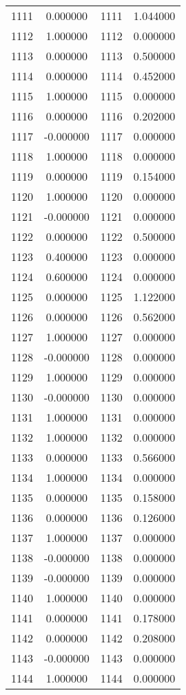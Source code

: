 \documentclass[12pt]{article}
\begin{document}
\begin{longtable}{@{}cccc@{}}
1111 & 0.000000 & 1111 & 1.044000 \\
1112 & 1.000000 & 1112 & 0.000000 \\
1113 & 0.000000 & 1113 & 0.500000 \\
1114 & 0.000000 & 1114 & 0.452000 \\
1115 & 1.000000 & 1115 & 0.000000 \\
1116 & 0.000000 & 1116 & 0.202000 \\
1117 & -0.000000 & 1117 & 0.000000 \\
1118 & 1.000000 & 1118 & 0.000000 \\
1119 & 0.000000 & 1119 & 0.154000 \\
1120 & 1.000000 & 1120 & 0.000000 \\
1121 & -0.000000 & 1121 & 0.000000 \\
1122 & 0.000000 & 1122 & 0.500000 \\
1123 & 0.400000 & 1123 & 0.000000 \\
1124 & 0.600000 & 1124 & 0.000000 \\
1125 & 0.000000 & 1125 & 1.122000 \\
1126 & 0.000000 & 1126 & 0.562000 \\
1127 & 1.000000 & 1127 & 0.000000 \\
1128 & -0.000000 & 1128 & 0.000000 \\
1129 & 1.000000 & 1129 & 0.000000 \\
1130 & -0.000000 & 1130 & 0.000000 \\
1131 & 1.000000 & 1131 & 0.000000 \\
1132 & 1.000000 & 1132 & 0.000000 \\
1133 & 0.000000 & 1133 & 0.566000 \\
1134 & 1.000000 & 1134 & 0.000000 \\
1135 & 0.000000 & 1135 & 0.158000 \\
1136 & 0.000000 & 1136 & 0.126000 \\
1137 & 1.000000 & 1137 & 0.000000 \\
1138 & -0.000000 & 1138 & 0.000000 \\
1139 & -0.000000 & 1139 & 0.000000 \\
1140 & 1.000000 & 1140 & 0.000000 \\
1141 & 0.000000 & 1141 & 0.178000 \\
1142 & 0.000000 & 1142 & 0.208000 \\
1143 & -0.000000 & 1143 & 0.000000 \\
1144 & 1.000000 & 1144 & 0.000000 \\

\end{longtable}
\end{document}
